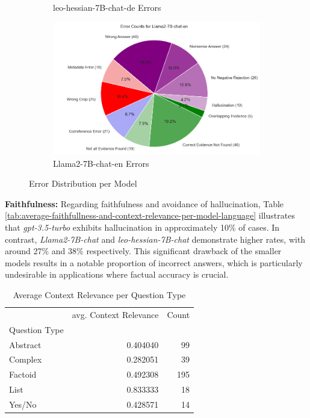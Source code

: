 \begin{figure}[h]
\begin{subfigure}{.5\textwidth}
        \caption{leo-hessian-7B-chat-de Errors}
        \label{fig:leo-de-errors}
    \end{subfigure}%
    \begin{subfigure}{.5\textwidth}
        \centering
        \includegraphics[width=\linewidth]{Grafiken/Evaluation/EndToEnd/llama.png}
        \caption{Llama2-7B-chat-en Errors}
        \label{fig:llama-en-errors}
    \end{subfigure}
    \caption{Error Distribution per Model}
    \label{fig:combined-errors}
\end{figure}

\noindent\textbf{Faithfulness:} Regarding faithfulness and avoidance of hallucination, Table \ref{tab:average-faithfullness-and-context-relevance-per-model-language} illustrates that \textit{gpt-3.5-turbo} exhibits hallucination in approximately 10\% of cases. In contrast, \textit{Llama2-7B-chat} and \textit{leo-hessian-7B-chat} demonstrate higher rates, with around 27\% and 38\% respectively. This significant drawback of the smaller models results in a notable proportion of incorrect answers, which is particularly undesirable in applications where factual accuracy is crucial.

\begin{table}[h]
    \centering
    \begin{tabular}{lrr}
        \toprule
         & avg. Context Relevance & Count \\
        Question Type &  &  \\
        \midrule
        Abstract & 0.404040 & 99 \\
        Complex & 0.282051 & 39 \\
        Factoid & 0.492308 & 195 \\
        List & 0.833333 & 18 \\
        Yes/No & 0.428571 & 14 \\
        \bottomrule
    \end{tabular}
    \caption{Average Context Relevance per Question Type}
    \label{tab:context-relevance-per-question-type}
\end{table}

